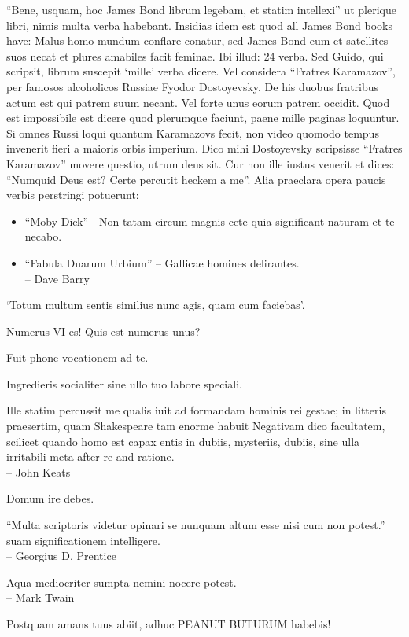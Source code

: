 \documentclass[titlepage,12pt]{memoir}
\begin{document}
“Bene, usquam, hoc James Bond librum legebam, et statim intellexi”
ut plerique libri, nimis multa verba habebant. Insidias idem est quod
all James Bond books have: Malus homo mundum conflare conatur, sed
James Bond eum et satellites suos necat et plures amabiles facit
feminae. Ibi illud: 24 verba. Sed Guido, qui scripsit, librum suscepit
‘mille’ verba dicere.
Vel considera “Fratres Karamazov”, per famosos alcoholicos Russiae
Fyodor Dostoyevsky. De his duobus fratribus actum est qui patrem suum necant.
Vel forte unus eorum patrem occidit. Quod est impossibile est dicere
quod plerumque faciunt, paene mille paginas loquuntur. Si omnes Russi loqui
quantum Karamazovs fecit, non video quomodo tempus invenerit fieri a
maioris orbis imperium.
Dico mihi Dostoyevsky scripsisse “Fratres Karamazov” movere
questio, utrum deus sit. Cur non ille iustus venerit
et dices: “Numquid Deus est? Certe percutit heckem a me”.
Alia praeclara opera paucis verbis perstringi potuerunt:
\begin{itemize}
\item “Moby Dick” - Non tatam circum magnis cete quia significant
  naturam et te necabo.
\item “Fabula Duarum Urbium” -- Gallicae homines delirantes.
\\-- Dave Barry
\end{itemize}

‘Totum multum sentis similius nunc agis, quam cum faciebas’.

Numerus VI es! Quis est numerus unus?

Fuit phone vocationem ad te.

 Ingredieris socialiter sine ullo tuo labore speciali.

Ille statim percussit me qualis iuit ad formandam hominis rei gestae;
in litteris praesertim, quam Shakespeare tam enorme habuit
Negativam dico facultatem, scilicet quando homo est capax entis
in dubiis, mysteriis, dubiis, sine ulla irritabili meta
after re and ratione.
\\-- John Keats

Domum ire debes.

“Multa scriptoris videtur opinari se nunquam altum esse nisi cum non potest.”
suam significationem intelligere.
\\-- Georgius D. Prentice

Aqua mediocriter sumpta nemini nocere potest.
\\-- Mark Twain

Postquam amans tuus abiit, adhuc PEANUT BUTURUM habebis!
\end{document}
